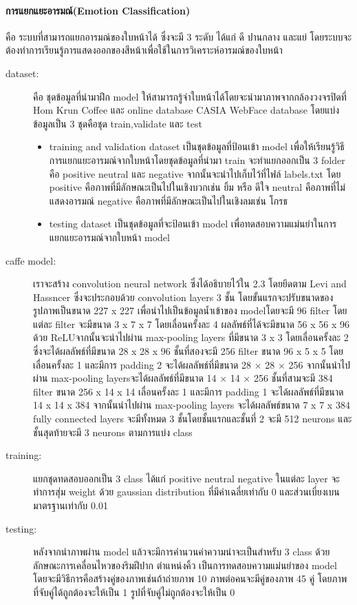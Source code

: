 \paragraph{\textbf{การแยกแยะอารมณ์(Emotion Classification)}}
คือ ระบบที่สามารถแยกอารมณ์ของใบหน้าได้ ซึ่งจะมี 3 ระดับ ได้แก่ ดี ปานกลาง และแย่ โดยระบบจะต้องทำการเรียนรู้การแสดงออกของสีหน้าเพื่อใช้ในการวิเคราะห์อารมณ์ของใบหน้า
\begin{description}
\item[dataset:] คือ ชุดข้อมูลที่นำมาฝึก model ให้สามารถรู้จำใบหน้าได้โดยจะนำมาภาพจากกล้องวงจรปิดที่ Hom Krun Coffee และ online database CASIA WebFace database โดยแบ่งข้อมูลเป็น 3 ชุดคือชุด train,validate และ test
\begin{itemize}
  \item training and validation dataset เป็นชุดข้อมูลที่ป้อนเข้า model เพื่อให้เรียนรู้วิธีการแยกแยะอารมณ์จากใบหน้าโดยชุดข้อมูลที่นำมา train จะทำแยกออกเป็น 3 folder คือ positive neutral และ negative จากนั้นจะนำไปเก็บไว้ที่ไฟล์ labels.txt โดย positive คือภาพที่มีลักษณะเป็นไปในเชิงบวกเช่น ยิ้ม หรือ ดีใจ neutral คือภาพที่ไม่แสดงอารมณ์ negative คือภาพที่มีลักษณะเป็นไปในเชิงลมเช่น โกรธ  
\item testing dataset เป็นชุดข้อมูลที่จะป้อนเข้า model เพื่อทดสอบความแม่นยำในการแยกแยะอารมณ์จากใบหน้า model
\end{itemize}
\item[caffe model:] เราจะสร้าง convolution neural network ซึ่งได้อธิบายไว้ใน 2.3 โดยยึดตาม Levi and Hassncer ซึ่งจะประกอบด้วย convolution layers 3 ชั้น โดยขั้นแรกจะปรับขนาดของรูปภาพเป็นขนาด 227 x 227 เพื่อนำไปเป็นข้อมูลน้ำเข้าของ modelโดยจะมี 96 filter โดยแต่ละ filter จะมีขนาด 3 x 7 x 7 โดยเลื่อนครั้งละ 4 ผลลัพธ์ที่ได้จะมีขนาด 56 x 56 x 96 ด้วย ReLUจากนั้นจะนำไปผ่าน max-pooling layers ที่มีขนาด 3 x 3 โดยเลื่อนครั้งละ 2 ซึ่งจะได้ผลลัพธ์ที่มีขนาด 28 x 28 x 96 ชั้นที่สองจะมี 256 filter ขนาด 96 x 5 x 5 โดยเลื่อนครั้งละ 1 และมีการ padding 2 จะได้ผลลัพธ์ที่มีขนาด 28 × 28 × 256 จากนั้นนำไปผ่าน max-pooling layersจะได้ผลลัพธ์ที่มีขนาด 14 × 14 × 256 ชั้นที่สามจะมี 384 filter ขนาด 256 x 14 x 14 เลื่อนครั้งละ 1 และมีการ padding 1 จะได้ผลลัพธ์ที่มีขนาด 14 x 14 x 384 จากนั้นนำไปผ่าน max-pooling layers จะได้ผลลัพธ์ขนาด 7 x 7 x 384 fully connected layers จะมีทั้งหมด 3 ชั้นโดยชั้นแรกและชั้นที่ 2 จะมี 512 neurons และชั้นสุดท้ายจะมี 3 neurons ตามการแบ่ง class

\item [training:] แยกชุดทดสอบออกเป็น 3 class ได้แก่ positive neutral negative ในแต่ละ layer จะทำการสุ่ม weight ด้วย gaussian distribution ที่มีค่าเฉลี่ยเท่ากับ 0 และส่วนเบี่ยงเบนมาตรฐานเท่ากับ 0.01

\item [testing:] หลังจากนำภาพผ่าน model แล้วจะมีการคำนวนค่าความน่าจะเป็นสำหรับ 3 class ด้วยลักษณะการเคลื่อนไหวของริมฝีปาก ตำแหน่งคิ้ว เป็นการทดสอบความแม่นยำของ model โดยจะมีวิธีการคือสร้างคู่ของภาพเช่นถ้าถ่ายภาพ 10 ภาพต่อคนจะมีคู่ของภาพ 45 คู่ โดยภาพที่จับคู่ได้ถูกต้องจะให้เป็น 1 รูปที่จับคู่ไม่ถูกต้องจะให้เป็น 0
\end{description}  

